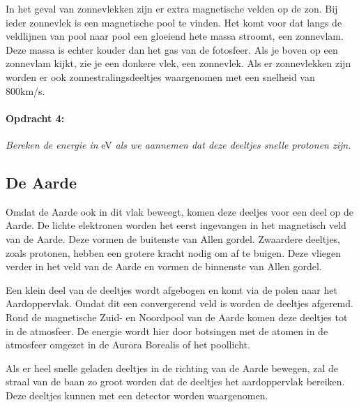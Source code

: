In het geval van zonnevlekken zijn er extra magnetische velden op
de zon. Bij ieder zonnevlek is een magnetische pool te vinden. Het
komt voor dat langs de veldlijnen van pool naar pool een gloeiend
hete massa stroomt, een zonnevlam. Deze massa is echter kouder dan
het gas van de fotosfeer. Als je boven op een zonnevlam kijkt, zie
je een donkere vlek, een zonnevlek. Als er zonnevlekken zijn worden
er ook zonnestralingsdeeltjes waargenomen met een snelheid van 800km/s.


\paragraph*{Opdracht 4:}

\emph{Bereken de energie in }eV\emph{ als we aannemen dat deze deeltjes
snelle protonen zijn. }


\subsection{De Aarde}

Omdat de Aarde ook in dit vlak beweegt, komen deze deeljes voor een
deel op de Aarde. De lichte elektronen worden het eerst ingevangen
in het magnetisch veld van de Aarde. Deze vormen de buitenste van
Allen gordel. Zwaardere deeltjes, zoals protonen, hebben een grotere
kracht nodig om af te buigen. Deze vliegen verder in het veld van
de Aarde en vormen de binnenste van Allen gordel.

Een klein deel van de deeltjes wordt afgebogen en komt via de polen
naar het Aardoppervlak. Omdat dit een convergerend veld is worden
de deeltjes afgeremd. Rond de magnetische Zuid- en Noordpool van de
Aarde komen deze deeltjes tot in de atmosfeer. De energie wordt hier
door botsingen met de atomen in de atmosfeer omgezet in de Aurora
Borealis of het poollicht. 

Als er heel snelle geladen deeltjes in de richting van de Aarde bewegen,
zal de straal van de baan zo groot worden dat de deeltjes het aardoppervlak
bereiken. Deze deeltjes kunnen met een detector worden waargenomen.


